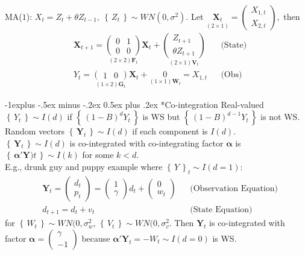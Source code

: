 \documentclass[paper=a4,fontsize=2.89mm]{scrartcl}
\makeatletter
\newcommand\set[1]{\left\{\, #1 \,\right\}}
\renewcommand{\subsection}{\@startsection{subsection}{2}{0mm}%
                                {-1explus -.5ex minus -.2ex}%
                                {0.5ex plus .2ex}%
                                {\normalfont\normalsize\bfseries}}
\makeatother
\begin{document}
\begin{multicols}{3}
MA($1$): $X_t = Z_t + \theta Z_{t-1}, ~\set{Z_t} \sim WN(0,\sigma^2).$ Let
$\underset{(2\times 1)}{\mathbf{X}_t} = \begin{pmatrix} X_{1,t} \\ X_{2,t} \end{pmatrix},$ then
\begin{align*}
&\mathbf{X}_{t+1}
= \underset{(2\times 2)\mathbf{F}_t}{\begin{pmatrix}
0 & 1 \\ 0 & 0
\end{pmatrix}}
\mathbf{X}_t + 
\underset{(2\times 1)\mathbf{V}_t}{\begin{pmatrix} Z_{t+1} \\ \theta Z_{t+1} \end{pmatrix}} && \text{(State)} \\
&Y_t = \underset{(1\times 2)\mathbf{G}_t}{\begin{pmatrix} 1 & 0 \end{pmatrix}}\mathbf{X}_t +\underset{(1\times 1)\mathbf{W}_t}{ 0 } = X_{1,t}&& \text{(Obs)}
\end{align*}



\subsection*{Co-integration}
Real-valued $\set{Y_t} \sim I(d)$ if $\set{(1-B)^d Y_t}$ is WS but $\set{(1-B)^{d-1} Y_t}$ is not WS. \\
Random vectors $\set{\mathbf{Y}_t} \sim I(d)$ if each component is $I(d)$. \\
$\set{\mathbf{Y}_t} \sim I(d)$ is co-integrated with co-integrating factor $\boldsymbol{\alpha}$ is $\set{\boldsymbol{\alpha}' \mathbf{Y})t} \sim I(k)$ for some $k < d$.\\
E.g., drunk guy and puppy example where $\set{Y}_t \sim I(d=1)$:
\begin{align*}
&\mathbf{Y}_t = \begin{pmatrix} d_t \\ p_t \end{pmatrix} = \begin{pmatrix} 1 \\ \gamma \end{pmatrix} d_t + \begin{pmatrix} 0 \\ w_t \end{pmatrix} && \text{(Observation Equation)} \\
&d_{t+1} = d_t + v_t && \text{(State Equation)}
\end{align*}
for $\set{W_t} \sim WN(0,\sigma^2_w$, $\set{V_t} \sim WN(0,\sigma^2_v$. 
Then $\mathbf{Y}_t$ is co-integrated with factor $\boldsymbol{\alpha} = \begin{pmatrix} \gamma \\ -1 \end{pmatrix}$ because $\boldsymbol{\alpha}' \mathbf{Y}_t = -W_t \sim I(d=0)$ is WS.


\end{multicols}
\end{document}
